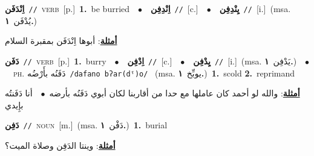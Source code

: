 \documentclass[10pt,a4paper,twoside]{article} %
\begin{document}
\begin{multicols}{2}
{\setlength\topsep{0pt}\textbf{\foreignlanguage{arabic}{اِنْدَفَن}}\ {\color{gray}\texttt{//}\color{black}}\ \textsc{verb}\ [p.]\ \textbf{1.}~be burried\ \ $\bullet$\ \ \setlength\topsep{0pt}\textbf{\foreignlanguage{arabic}{اِنْدِفِن}}\ {\color{gray}\texttt{//}\color{black}}\ [c.]\ \ $\bullet$\ \ \setlength\topsep{0pt}\textbf{\foreignlanguage{arabic}{يِنْدِفِن}}\ {\color{gray}\texttt{//}\color{black}}\ [i.]\ \color{gray}(msa. \foreignlanguage{arabic}{يُدْفَن}~\foreignlanguage{arabic}{\textbf{١.}})\color{black}\  \begin{flushright}\color{gray}\foreignlanguage{arabic}{\textbf{\underline{\foreignlanguage{arabic}{أمثلة}}}: أبوها اِنْدَفَن بمقبرة السلام}\end{flushright}\color{black}} \vspace{2mm}

{\setlength\topsep{0pt}\textbf{\foreignlanguage{arabic}{دَفَن}}\ {\color{gray}\texttt{//}\color{black}}\ \textsc{verb}\ [p.]\ \textbf{1.}~burry\ \ $\bullet$\ \ \setlength\topsep{0pt}\textbf{\foreignlanguage{arabic}{اِدْفِن}}\ {\color{gray}\texttt{//}\color{black}}\ [c.]\ \ $\bullet$\ \ \setlength\topsep{0pt}\textbf{\foreignlanguage{arabic}{يِدْفِن}}\ {\color{gray}\texttt{//}\color{black}}\ [i.]\ \color{gray}(msa. \foreignlanguage{arabic}{يَدْفِن}~\foreignlanguage{arabic}{\textbf{١.}})\color{black}\ \ $\bullet$\ \ \textsc{ph.} \color{gray} \foreignlanguage{arabic}{دَفَنُه بأَرْضُه}\color{black}\ {\color{gray}\texttt{/{\sffamily dafano bʔar(dˤ)o}/}\color{black}}\ \color{gray} (msa. \foreignlanguage{arabic}{يوبِّخ}~\foreignlanguage{arabic}{\textbf{١.}})\color{black}\ \textbf{1.}~scold  \textbf{2.}~reprimand\  \begin{flushright}\color{gray}\foreignlanguage{arabic}{\textbf{\underline{\foreignlanguage{arabic}{أمثلة}}}: والله لو أحمد كان عاملها مع حدا من أقاربنا لكان أبوي دَفَنُه بأرضه\ $\bullet$\ \  أنا دَفَنتُه بإِيدي}\end{flushright}\color{black}} \vspace{2mm}

{\setlength\topsep{0pt}\textbf{\foreignlanguage{arabic}{دَفِن}}\ {\color{gray}\texttt{//}\color{black}}\ \textsc{noun}\ [m.]\ \color{gray}(msa. \foreignlanguage{arabic}{دَفْن}~\foreignlanguage{arabic}{\textbf{١.}})\color{black}\ \textbf{1.}~burial\  \begin{flushright}\color{gray}\foreignlanguage{arabic}{\textbf{\underline{\foreignlanguage{arabic}{أمثلة}}}: وينتا الدَفِن وصلاة الميت؟}\end{flushright}\color{black}} \vspace{2mm}


\end{multicols}
\end{document}
